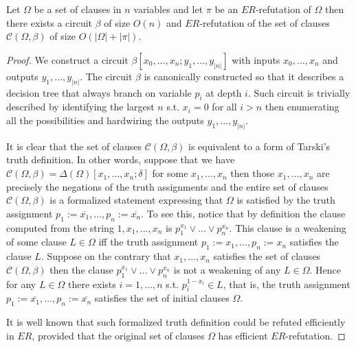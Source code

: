 \documentclass{LMCS}
\theoremstyle{plain}\newtheorem{satz}[thm]{Satz}
\begin{document}
\begin{lem}
\label{l_er}
Let $\Omega$ be a set of clauses in $n$ variables and let $\pi$ be an $ER$-refutation of $\Omega$ then there exists a circuit $\beta$ of size $O(n)$ and $ER$-refutation of the set of clauses ${\mathcal C}(\Omega, \beta)$ of size $O(|\Omega|+|\pi|)$.
\begin{proof}
We construct a circuit $\beta[x_0,...,x_n;y_1,...,y_{|n|}]$ with inputs $x_0,...,x_n$ and outputs $y_1,...,y_{|n|}$. The circuit $\beta$ is canonically constructed so that it describes a decision tree that always branch on variable $p_i$ at depth $i$. Such circuit is trivially described by identifying the largest $n$ s.t. $x_i = 0$ for all $i > n$ then enumerating all the possibilities and hardwiring the outputs $y_1,...,y_{|n|}$.

It is clear that the set of clauses ${\mathcal C}(\Omega, \beta)$ is equivalent to a form of Tarski's truth definition. In other words, suppose that we have ${\mathcal C}(\Omega, \beta) = \Delta(\Omega) [x_1,...,x_n;\delta]$ for some $x_1,...,x_n$ then those $x_1,...,x_n$ are precisely the negations of the truth assignments and the entire set of clauses ${\mathcal C}(\Omega, \beta)$ is a formalized statement expressing that $\Omega$ is satisfied by the truth assignment $p_1 := \overline{x_1},...,p_n := \overline{x_n}$. To see this, notice that by definition the clause computed from the string $1,x_1,...,x_n$ is $p^{x_1}_1 \lor ... \lor p^{x_n}_n$. This clause is a weakening of some clause $L \in \Omega$ iff the truth assignment $p_1 := x_1, ..., p_n := x_n$ satisfies the clause $L$. Suppose on the contrary that $x_1,...,x_n$ satisfies the set of clauses ${\mathcal C}(\Omega, \beta)$ then the clause $p^{x_1}_1 \lor ... \lor p^{x_n}_n$ is not a weakening of any $L \in \Omega$. Hence for any $L \in \Omega$ there exists $i=1,...,n$ s.t. $p^{1-x_i}_i \in L$, that is, the truth assignment $p_1 := \overline{x_1},...,p_n := \overline{x_n}$ satisfies the set of initial clauses $\Omega$.

It is well known that such formalized truth definition could be refuted efficiently in $ER$, provided that the original set of clauses $\Omega$ has efficient $ER$-refutation.
\end{proof}
\end{lem}
\end{document}

